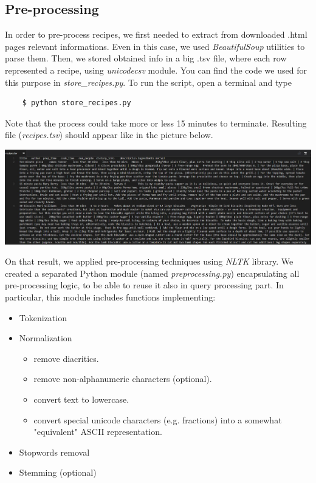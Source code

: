 \subsection{Pre-processing}

In order to pre-process recipes, we first needed to extract from downloaded .html pages relevant informations.  Even in this case, we used \textit{BeautifulSoup}\cite{beaut_soup} utilities to parse them. Then, we stored obtained info in a big .tsv file, where each row represented a recipe, using \textit{unicodecsv}\cite{csv} module. You can find the code we used for this purpose in \textit{store\_recipes.py}. To run the script, open a terminal and type
\begin{lstlisting}
	$ python store_recipes.py
\end{lstlisting}
Note that the process could take more or less 15 minutes to terminate. Resulting file (\textit{recipes.tsv}) should appear like in the picture below.
\begin{center}
	\vspace{5mm}
	\includegraphics[scale=0.3]{img/recipes-tsv.jpg}
\end{center}
On that result, we applied pre-processing techniques using \textit{NLTK}\cite{nltk} library. We created a separated Python module (named \textit{preprocessing.py}) encapsulating all pre-processing logic, to be able to reuse it also in query processing part. In particular, this module includes functions implementing:
\begin{itemize}
	\item Tokenization
	\item Normalization
	\begin{itemize}
		\item remove diacritics.
		\item remove non-alphanumeric characters (optional).
		\item convert text to lowercase.
		\item convert special unicode characters (e.g. fractions) into a somewhat "equivalent" ASCII representation.
	\end{itemize}
	\item Stopwords removal
	\item Stemming (optional)
\end{itemize}
